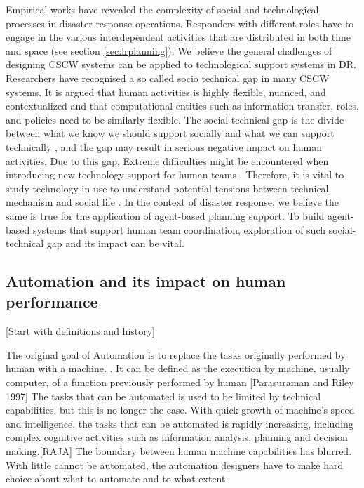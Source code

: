 Empirical works \cite{Petrescu-prahova2005,Kopena2008,Fischer2015,Zerger2003} have revealed the complexity of social and technological processes in disaster response operations. Responders with different roles have to engage in the various interdependent activities that are distributed in both time and space (see section \ref{sec:lrplanning}). We believe the general challenges of designing CSCW systems can be applied to technological support systems in DR. Researchers have recognised a so called socio technical gap in many CSCW systems. It is argued that \cite{Ackerman2000}  human activities is highly flexible, nuanced, and contextualized and that computational entities such as information transfer, roles, and policies need to be similarly flexible. The social-technical gap is the divide between what we know we should support socially and what we can support technically \cite{Ackerman2000}, and the gap may result in serious negative impact on human activities. Due to this gap, Extreme difficulties might be encountered when introducing new technology support for human teams \cite{Bowers1994,Abbott1994a}. Therefore, it is vital to study technology in use to understand potential tensions between technical mechanism and social life \cite{Bowers1994}.  In the context of disaster response, we believe the same is true for the application of agent-based planning support. To build agent-based systems that support human team coordination, exploration of such social-technical gap and its impact can be vital. \\ 



\subsection{Automation and its impact on human performance}
[Start with definitions and history]

The original goal of Automation is to replace the tasks originally performed by human with a machine. \cite{Bradshaw2011} . It can be defined as the execution by machine, usually computer, of a function previously performed by human [Parasuraman and Riley 1997] The tasks that can be automated is used to be limited by technical capabilities, but this is no longer the case. With quick growth of machine's speed and intelligence, the tasks that can be automated is rapidly increasing, including complex cognitive activities such as information analysis, planning and decision making.[RAJA] The boundary between human machine capabilities has blurred. With little cannot be automated, the automation designers have to make hard choice about what to automate and to what extent.\\

